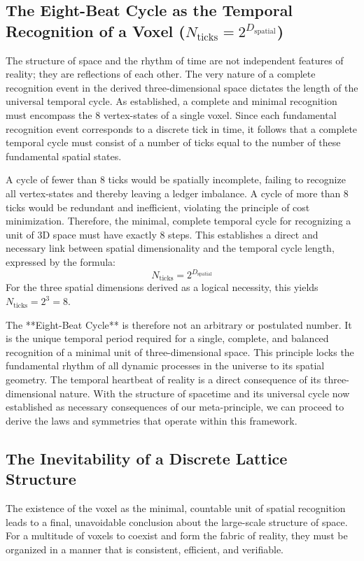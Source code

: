 \subsection{The Eight-Beat Cycle as the Temporal Recognition of a Voxel \texorpdfstring{($N_{\text{ticks}} = 2^{D_{\text{spatial}}}$)}{(N_ticks = 2^D_spatial)}}
The structure of space and the rhythm of time are not independent features of reality; they are reflections of each other. The very nature of a complete recognition event in the derived three-dimensional space dictates the length of the universal temporal cycle. As established, a complete and minimal recognition must encompass the 8 vertex-states of a single voxel. Since each fundamental recognition event corresponds to a discrete tick in time, it follows that a complete temporal cycle must consist of a number of ticks equal to the number of these fundamental spatial states.

A cycle of fewer than 8 ticks would be spatially incomplete, failing to recognize all vertex-states and thereby leaving a ledger imbalance. A cycle of more than 8 ticks would be redundant and inefficient, violating the principle of cost minimization. Therefore, the minimal, complete temporal cycle for recognizing a unit of 3D space must have exactly 8 steps. This establishes a direct and necessary link between spatial dimensionality and the temporal cycle length, expressed by the formula:
\begin{equation}
N_{\text{ticks}} = 2^{D_{\text{spatial}}}
\end{equation}
For the three spatial dimensions derived as a logical necessity, this yields \(N_{\text{ticks}} = 2^3 = 8\).

The **Eight-Beat Cycle** is therefore not an arbitrary or postulated number. It is the unique temporal period required for a single, complete, and balanced recognition of a minimal unit of three-dimensional space. This principle locks the fundamental rhythm of all dynamic processes in the universe to its spatial geometry. The temporal heartbeat of reality is a direct consequence of its three-dimensional nature. With the structure of spacetime and its universal cycle now established as necessary consequences of our meta-principle, we can proceed to derive the laws and symmetries that operate within this framework.

\subsection{The Inevitability of a Discrete Lattice Structure}
The existence of the voxel as the minimal, countable unit of spatial recognition leads to a final, unavoidable conclusion about the large-scale structure of space. For a multitude of voxels to coexist and form the fabric of reality, they must be organized in a manner that is consistent, efficient, and verifiable.

